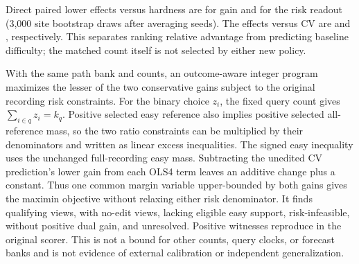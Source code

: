 Direct paired lower effects versus hardness are
\AdvantageGainEffect{} for gain and \AdvantageRiskEffect{} for
the risk readout (3,000 site bootstrap draws after averaging
seeds). The effects versus CV are \AdvantageGainCV{} and
\AdvantageRiskCV{}, respectively. This separates ranking
relative advantage from predicting baseline difficulty; the
matched count itself is not selected by either new policy.

With the same path bank and counts, an outcome-aware
integer program maximizes the lesser of the two conservative
gains subject to the original recording risk constraints.
For the binary choice $z_i$, the fixed query count gives
$\sum_{i\in q}z_i=k_q$. Positive selected easy reference
also implies positive selected all-reference mass, so the
two ratio constraints can be multiplied by their
denominators and written as linear excess inequalities.
The signed easy inequality uses the unchanged full-recording
easy mass. Subtracting the unedited CV prediction's lower
gain from each OLS4 term leaves an additive change plus a
constant. Thus one common margin variable upper-bounded by
both gains gives the maximin objective without relaxing
either risk denominator.
It finds \AdvantageCapacity{} qualifying views,
with \AdvantageNoEdit{} no-edit views, \AdvantageNoEasy{} lacking
eligible easy support, \AdvantageInfeasible{} risk-infeasible,
\AdvantageNoDual{} without positive dual gain, and
\AdvantageUnresolved{} unresolved. Positive witnesses reproduce
in the original scorer. This is not a bound for other
counts, query clocks, or forecast banks and is not evidence
of external calibration or independent generalization.

